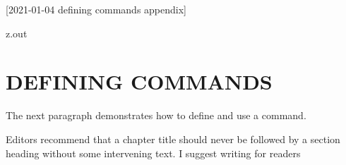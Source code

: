 [2021-01-04 defining commands appendix]

\begin{VerbatimOut}{z.out}
\chapter{DEFINING COMMANDS}

The next paragraph demonstrates how to define and use a command.

\renewcommand{\t}[2]
{%
  Editors recommend that a #1 should never be
  followed by a #2 without some intervening text.
  I suggest writing for readers

}

\t{chapter title}{section heading}
\end{VerbatimOut}
\MyIO
